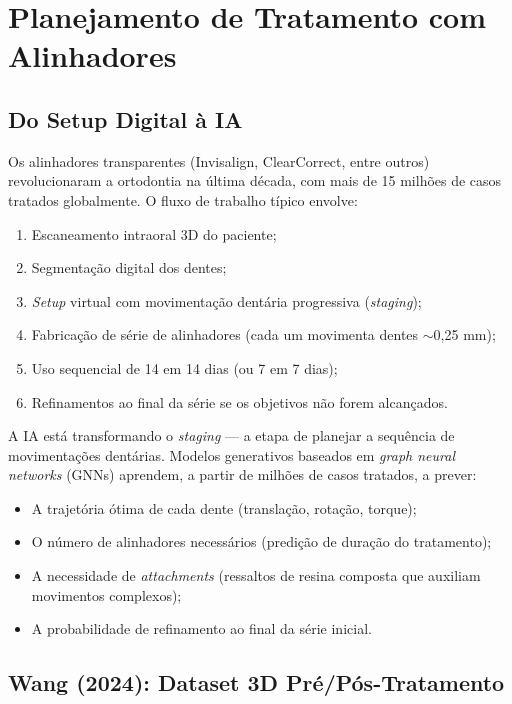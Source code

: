\section{Planejamento de Tratamento com Alinhadores}

\subsection{Do Setup Digital à IA}

Os alinhadores transparentes (Invisalign\textregistered, ClearCorrect\textregistered, entre outros) revolucionaram a ortodontia na última década, com mais de 15 milhões de casos tratados globalmente. O fluxo de trabalho típico envolve:
\begin{enumerate}
    \item Escaneamento intraoral 3D do paciente;
    \item Segmentação digital dos dentes;
    \item \textit{Setup} virtual com movimentação dentária progressiva (\textit{staging});
    \item Fabricação de série de alinhadores (cada um movimenta dentes $\sim$0,25 mm);
    \item Uso sequencial de 14 em 14 dias (ou 7 em 7 dias);
    \item Refinamentos ao final da série se os objetivos não forem alcançados.
\end{enumerate}

A IA está transformando o \textit{staging} --- a etapa de planejar a sequência de movimentações dentárias. Modelos generativos baseados em \textit{graph neural networks} (GNNs) aprendem, a partir de milhões de casos tratados, a prever:
\begin{itemize}
    \item A trajetória ótima de cada dente (translação, rotação, torque);
    \item O número de alinhadores necessários (predição de duração do tratamento);
    \item A necessidade de \textit{attachments} (ressaltos de resina composta que auxiliam movimentos complexos);
    \item A probabilidade de refinamento ao final da série inicial.
\end{itemize}

\subsection{Wang (2024): Dataset 3D Pré/Pós-Tratamento}

